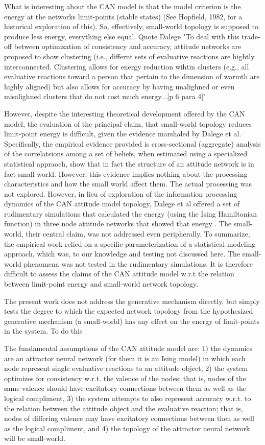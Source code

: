\documentclass{article}
\begin{document}
What is interesting about the CAN model is that the model criterion is the energy at the networks limit-points (stable states) (See Hopfield, 1982, for a historical exploration of this).  So, effectively, small-world topology is supposed to produce less energy, everything else equal. Quote Dalege "To deal with this trade-off between optimization of consistency and accuracy, attitude networks are proposed to show clustering (i.e., differnt sets of evaluative reactions are hightly interconnected.  Clustering allows for energy reduction wihtin clusters (e.g., all evaluative reactions toward a person that pertain to the dimension of warmth are highly aligned) but also allows for accuracy by having unalighned or even misalighned clusters that do not cost much energy...[p 6 para 4]" 

However, despite the interesting theoretical development offered by the CAN model, the evaluation of the principal claim, that small-world topology reduces limit-point energy is difficult, given the evidence marshaled by Dalege et al.  Specifically, the empirical evidence provided is cross-sectional (aggregate) analysis of the correlatsions among a set of beliefs, when estimated using a specialized statistical appraoch, show that in fact the structure of an attitude network is in fact small world.  However, this evidence implies nothing about the processing characteristics and how the small world affect them. The actual processing was not explored. However, in lieu of exploration of the information processing dynamics of the CAN attitude model topology, Dalege et al offered a set of rudimentary simulations that calculated the energy (using the Ising Hamiltonian function) in three node attitude networks that showed that energy .  The small-world, their central claim, was not addressed even peripherally.  To summarize, the empirical work relied on a specific parameterization of a statistical modeling approach, which was, to our knowledge and testing not discussed here.  The small-world phenomena was not tested in the rudimentary simulations.  It is therefore difficult to assess the claims of the CAN attitude model w.r.t the relation between limit-point energy and small-world network topology.

The present work does not address the generative mechanism directly, but simply tests the degree to which the expected network topology from the hypothesized generative mechanism (a small-world) has any effect on the energy of limit-points in the system.    To do this 

The fundamental assumptions of the CAN attitude model are: 1) the dynamics are an attractor neural network (for them it is an Ising model) in which each node represent single evaluative reactions to an attitude object, 2) the system optimizes for consistency w.r.t. the valence of the nodes; that is, nodes of the same valence should have excitatory connections between them as well as the logical compliment, 3) the system attempts to also represent accuracy w.r.t. to the relation between the attitude object and the evaluative reaction; that is, nodes of differing valence may have excitatory connections between then as well as the logical compliment, and 4) the topology of the attractor neural network will be small-world.
\end{document}
